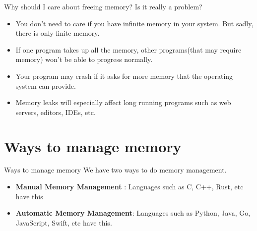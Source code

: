\documentclass[
  10pt,
  ignorenonframetext,
]{beamer}
\providecommand{\tightlist}{%
  \setlength{\itemsep}{0pt}\setlength{\parskip}{0pt}}
\begin{document}
\begin{frame}{Why should I care about freeing
memory? Is it really a problem?}
\protect\hypertarget{why-should-i-care-about-freeing-memory-is-it-really-a-problem}{}
\begin{itemize}
\tightlist
\item
  You don't need to care if you have infinite
  memory in your system. But sadly, there is only
  finite memory.
\end{itemize}

\pause

\begin{itemize}
\tightlist
\item
  If one program takes up all the memory, other
  programs(that may require memory) won't be able
  to progress normally.
\end{itemize}

\pause

\begin{itemize}
\tightlist
\item
  Your program may crash if it asks for more
  memory that the operating system can provide.
\end{itemize}

\pause

\begin{itemize}
\tightlist
\item
  Memory leaks will especially affect long running
  programs such as web servers, editors, IDEs,
  etc.
\end{itemize}
\end{frame}

\hypertarget{ways-to-manage-memory}{%
\section{Ways to manage
memory}\label{ways-to-manage-memory}}

\begin{frame}{Ways to manage memory}
We have two ways to do memory management.

\pause

\begin{itemize}
\item
  \textbf{Manual Memory Management} : Languages
  such as C, C++, Rust, etc have this
\item
  \textbf{Automatic Memory Management}: Languages
  such as Python, Java, Go, JavaScript, Swift, etc
  have this.
\end{itemize}
\end{frame}
\end{document}
